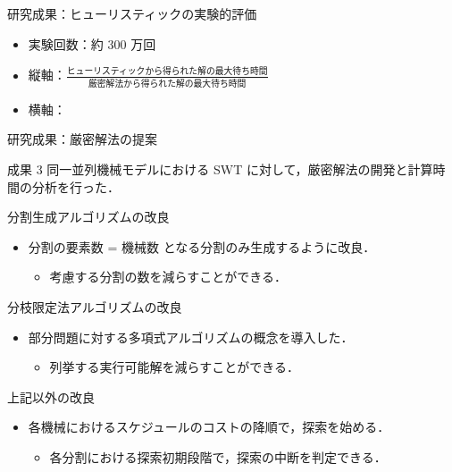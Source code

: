 \documentclass[dvipdfmx]{beamer}
\begin{document}
    \begin{frame}{研究成果：ヒューリスティックの実験的評価}
      \begin{itemize}
        \item 実験回数：約 $300$ 万回
        \item 縦軸：$\frac{\text{ヒューリスティックから得られた解の最大待ち時間}}{\text{厳密解法から得られた解の最大待ち時間}}$
        \item 横軸：
      \end{itemize}
    \end{frame}

    \begin{frame}{研究成果：厳密解法の提案}
      \begin{alertblock}{成果 3}
        同一並列機械モデルにおける SWT に対して，厳密解法の開発と計算時間の分析を行った．
      \end{alertblock}
      \begin{block}{分割生成アルゴリズムの改良}
        \begin{itemize}
          \item \alert{分割の要素数 = 機械数} となる分割のみ生成するように改良．
          \begin{itemize}
            \item 考慮する分割の数を減らすことができる．
          \end{itemize}
        \end{itemize}
      \end{block}
      \begin{block}{分枝限定法アルゴリズムの改良}
        \begin{itemize}
          \item \alert{部分問題に対する多項式アルゴリズム}の概念を導入した．
          \begin{itemize}
            \item 列挙する実行可能解を減らすことができる．
          \end{itemize}
        \end{itemize}
      \end{block}
      \begin{block}{上記以外の改良}
        \begin{itemize}
          \item 各機械におけるスケジュールのコストの降順で，探索を始める．
          \begin{itemize}
            \item 各分割における探索初期段階で，探索の中断を判定できる．
          \end{itemize}
        \end{itemize}
      \end{block}
    \end{frame}
\end{document}
